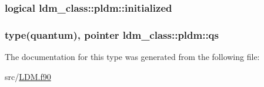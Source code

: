 \hypertarget{structldm__class_1_1pldm_a9e7c99c2898b7cd687638fb1d6f5800c}{
\subsubsection[{initialized}]{\setlength{\rightskip}{0pt plus 5cm}logical ldm\+\_\+class\+::pldm\+::initialized\hspace{0.3cm}{\ttfamily [private]}}}\label{structldm__class_1_1pldm_a9e7c99c2898b7cd687638fb1d6f5800c}
\hypertarget{structldm__class_1_1pldm_acf354ba01790a6d541eeb86739e0a5c4}{
\subsubsection[{qs}]{\setlength{\rightskip}{0pt plus 5cm}type(quantum), pointer ldm\+\_\+class\+::pldm\+::qs\hspace{0.3cm}{\ttfamily [private]}}}\label{structldm__class_1_1pldm_acf354ba01790a6d541eeb86739e0a5c4}


The documentation for this type was generated from the following file\+:\begin{DoxyCompactItemize}
\item 
src/\hyperlink{_l_d_m_8f90}{L\+D\+M.\+f90}\end{DoxyCompactItemize}
